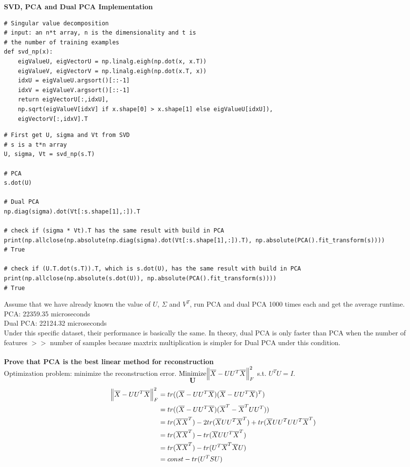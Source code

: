 \documentclass[12pt]{article}
\begin{document}
\textbf{SVD, PCA and Dual PCA Implementation}
\begin{spacing}{1.0}
\begin{lstlisting}
# Singular value decomposition
# input: an n*t array, n is the dimensionality and t is 
# the number of training examples
def svd_np(x):
    eigValueU, eigVectorU = np.linalg.eigh(np.dot(x, x.T))
    eigValueV, eigVectorV = np.linalg.eigh(np.dot(x.T, x))
    idxU = eigValueU.argsort()[::-1]
    idxV = eigValueV.argsort()[::-1]
    return eigVectorU[:,idxU], 
    np.sqrt(eigValueV[idxV] if x.shape[0] > x.shape[1] else eigValueU[idxU]), 
    eigVectorV[:,idxV].T
\end{lstlisting}
\begin{lstlisting}
# First get U, sigma and Vt from SVD
# s is a t*n array
U, sigma, Vt = svd_np(s.T)

# PCA
s.dot(U)

# Dual PCA
np.diag(sigma).dot(Vt[:s.shape[1],:]).T

# check if (sigma * Vt).T has the same result with build in PCA
print(np.allclose(np.absolute(np.diag(sigma).dot(Vt[:s.shape[1],:]).T), np.absolute(PCA().fit_transform(s))))
# True

# check if (U.T.dot(s.T)).T, which is s.dot(U), has the same result with build in PCA
print(np.allclose(np.absolute(s.dot(U)), np.absolute(PCA().fit_transform(s))))
# True
\end{lstlisting}
\end{spacing}
\noindent
Assume that we have already known the value of $U$, $\Sigma$ and $V^T$, run PCA and dual PCA 1000 times each and get the average runtime.\\
PCA: 22359.35 microseconds\\
Dual PCA: 22124.32 microseconds\\
Under this specific dataset, their performance is basically the same. In theory, dual PCA is only faster than PCA when the number of features $>>$ number of samples because maxtrix multiplication is simpler for Dual PCA under this condition.\\\\
\textbf{Prove that PCA is the best linear method for reconstruction}\\
Optimization problem: minimize the reconstruction error. $\stackunder{Minimize}{\textbf{U}}\norm{\overline{X}-UU^T\overline{X}}_F^2$ s.t. $U^TU=I$.
\begin{equation}
\begin{split}
\norm{\overline{X}-UU^T\overline{X}}_F^2 & = tr((\overline{X}-UU^T\overline{X})(\overline{X}-UU^T\overline{X})^T)\\
& = tr((\overline{X}-UU^T\overline{X})(\overline{X}^T-\overline{X}^TUU^T))\\
& = tr(\overline{X}\overline{X}^T) - 2tr(\overline{X}UU^T\overline{X}^T) + tr(\overline{X}UU^TUU^T\overline{X}^T)\\
& = tr(\overline{X}\overline{X}^T) - tr(\overline{X}UU^T\overline{X}^T)\\
& = tr(\overline{X}\overline{X}^T) - tr(U^T\overline{X}^T\overline{X}U)\\
& = const - tr(U^TSU)
\end{split}
\end{equation}
\end{document}
